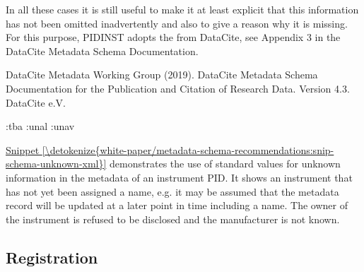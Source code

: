 \documentclass[a4paper,10pt,english]{sphinxmanual}
\begin{document}
\sphinxAtStartPar
In all these cases it is still useful to make it at least explicit
that this information has not been omitted inadvertently and also to
give a reason why it is missing.  For this purpose, PIDINST adopts the
 from DataCite, see Appendix
3 in the DataCite Metadata Schema Documentation.%
\begin{footnote}[3]\sphinxAtStartFootnote
DataCite Metadata Working Group (2019).  DataCite Metadata Schema
Documentation for the Publication and Citation of Research Data.
Version 4.3.  DataCite e.V.  
%
\end{footnote}
\def\sphinxLiteralBlockLabel{\label{\detokenize{white-paper/metadata-schema-recommendations:snip-schema-unknown-xml}}}
\begin{sphinxVerbatim}[commandchars=\\\{\}]
  :tba
        :unal
        :unav
\end{sphinxVerbatim}

\sphinxAtStartPar
\hyperref[\detokenize{white-paper/metadata-schema-recommendations:snip-schema-unknown-xml}]{Snippet \ref{\detokenize{white-paper/metadata-schema-recommendations:snip-schema-unknown-xml}}} demonstrates the use of standard
values for unknown information in the metadata of an instrument PID.
It shows an instrument that has not yet been assigned a name, e.g. it
may be assumed that the metadata record will be updated at a later
point in time including a name.  The owner of the instrument is
refused to be disclosed and the manufacturer is not known.


\subsection{Registration}
\label{\detokenize{white-paper/registration:registration}}\label{\detokenize{white-paper/registration::doc}}
\end{document}
